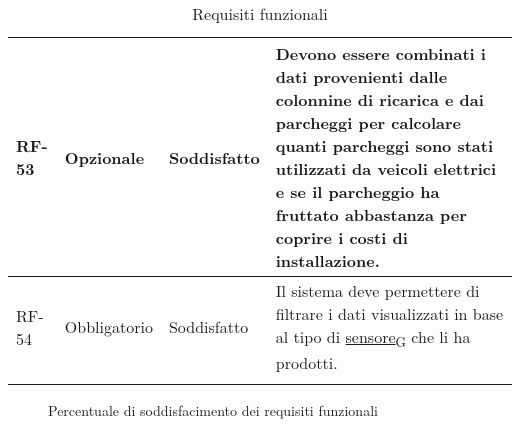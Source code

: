\begin{longtable}{|>{\centering\arraybackslash}m{}|>{\centering\arraybackslash}m{}|>{\centering\arraybackslash}m{}|>{\centering\arraybackslash}m{}|}
	\\\hline
	RF-53           & Opzionale           & Soddisfatto & Devono essere combinati i dati provenienti dalle colonnine di ricarica e dai parcheggi per calcolare quanti parcheggi sono stati utilizzati da veicoli elettrici e se il parcheggio ha fruttato abbastanza per coprire i costi di installazione.
	\\\hline
	RF-54           & Obbligatorio        & Soddisfatto & Il sistema deve permettere di filtrare i dati visualizzati in base al tipo di \href{https://7last.github.io/docs/pb/documentazione-interna/glossario\#sensore}{sensore\textsubscript{G}} che li ha prodotti.
	\\\hline
	\caption{Requisiti funzionali}
\end{longtable}


\begin{figure}[!h]
	\centering
	\caption{Percentuale di soddisfacimento dei requisiti funzionali}
\end{figure}


\newpage 
